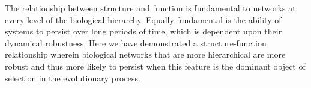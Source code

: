 The relationship between structure and function is fundamental to networks at every level of the biological hierarchy. Equally fundamental is the ability of systems to persist over long periods of time, which is dependent upon their dynamical robustness. Here we have demonstrated a structure-function relationship wherein biological networks that are more hierarchical are more robust and thus more likely to persist when this feature is the dominant object of selection in the evolutionary process.
